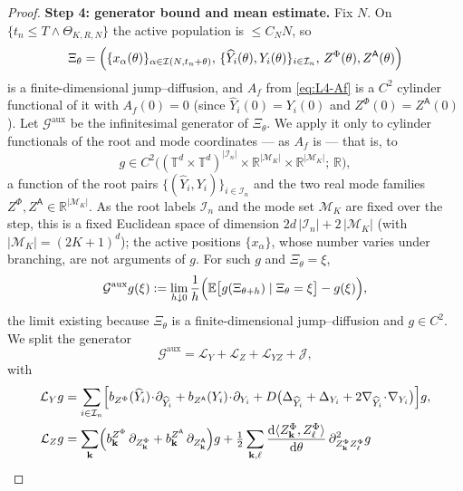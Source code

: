 \documentclass[a4paper,fleqn]{cas-sc}
\theoremstyle{definition}
\theoremstyle{remark}
\begin{document}
\begin{proof}
\medskip
\noindent\textbf{Step 4: generator bound and mean estimate.}
Fix $N$. On $\{t_n\le T\wedge\Theta_{K,R,N}\}$ the active population is $\le C_NN$, so
\[
\Xi_\theta=\Bigl(\{x_\alpha(\theta)\}_{\alpha\in\mathcal I(N,t_n+\theta)},\,
\{\widehat Y_i(\theta),Y_i(\theta)\}_{i\in\mathcal I_n},\,
Z^\Phi(\theta),Z^{\mathsf A}(\theta)\Bigr)
\]
is a finite-dimensional jump--diffusion, and $A_f$ from \eqref{eq:L4-Af} is a $C^2$ cylinder
functional of it with $A_f(0)=0$ (since $\widehat Y_i(0)=Y_i(0)$ and $Z^\Phi(0)=Z^{\mathsf A}(0)$).
Let $\mathcal G^{\mathrm{aux}}$ be the infinitesimal generator of $\Xi_\theta$. We apply it only to
cylinder functionals of the root and mode coordinates --- as $A_f$ is --- that is, to
\[
g\in C^2\bigl((\mathbb T^d\times\mathbb T^d)^{|\mathcal I_n|}\times\mathbb R^{|\mathcal M_K|}\times\mathbb R^{|\mathcal M_K|};\,\mathbb R\bigr),
\]
a function of the root pairs $\{(\widehat Y_i,Y_i)\}_{i\in\mathcal I_n}$ and the two real mode families
$Z^\Phi,Z^{\mathsf A}\in\mathbb R^{|\mathcal M_K|}$. As the root labels $\mathcal I_n$ and the mode set
$\mathcal M_K$ are fixed over the step, this is a fixed Euclidean space of dimension
$2d\,|\mathcal I_n|+2\,|\mathcal M_K|$ (with $|\mathcal M_K|=(2K+1)^d$); the active positions
$\{x_\alpha\}$, whose number varies under branching, are not arguments of $g$. For such $g$ and
$\Xi_\theta=\xi$,
\begin{equation}\label{eq:L4-gendef}
\mathcal G^{\mathrm{aux}}g(\xi)
:=\lim_{h\downarrow0}\frac1h\Bigl(\mathbb E\bigl[g(\Xi_{\theta+h})\mid\Xi_\theta=\xi\bigr]-g(\xi)\Bigr),
\end{equation}
the limit existing because $\Xi_\theta$ is a finite-dimensional jump--diffusion and $g\in C^2$.
We split the generator
\begin{equation}\label{eq:L4-split}
\mathcal G^{\mathrm{aux}}=\mathcal L_Y+\mathcal L_Z+\mathcal L_{YZ}+\mathcal J,
\end{equation}
with
\begin{equation}\label{eq:L4-genops}
\begin{aligned}
\mathcal L_Yg&=\sum_{i\in\mathcal I_n}\Bigl[
b_{Z^\Phi}(\widehat Y_i)\!\cdot\!\partial_{\widehat Y_i}
+b_{Z^{\mathsf A}}(Y_i)\!\cdot\!\partial_{Y_i}
+D\bigl(\Delta_{\widehat Y_i}+\Delta_{Y_i}+2\nabla_{\widehat Y_i}\!\cdot\!\nabla_{Y_i}\bigr)\Bigr]g,\\
\mathcal L_Zg&=\sum_{\mathbf k}\Bigl(b^{Z^\Phi}_{\mathbf k}\,\partial_{Z^\Phi_{\mathbf k}}
+b^{Z^{\mathsf A}}_{\mathbf k}\,\partial_{Z^{\mathsf A}_{\mathbf k}}\Bigr)g
+\tfrac12\sum_{\mathbf k,\ell}\frac{\mathrm d\langle Z^\Phi_{\mathbf k},Z^\Phi_\ell\rangle}{\mathrm d\theta}\,\partial^2_{Z^\Phi_{\mathbf k}Z^\Phi_\ell}g\\

\end{aligned}
\end{equation}
\end{proof}
\end{document}
